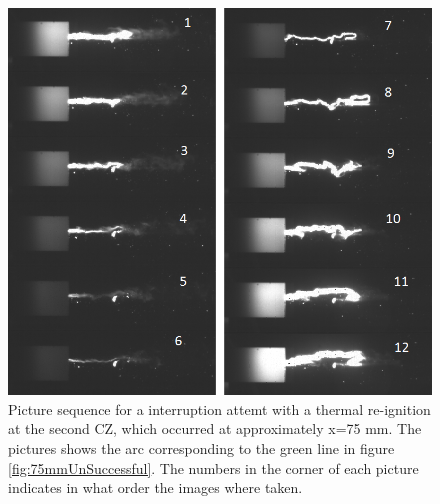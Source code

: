 \documentclass[10pt,b5paper,twoside]{article}
\begin{document}
\begin{figure}[H]
\centering
\includegraphics[scale=0.7, angle =0 ]{Bilder/Results/120_75_TR_TR.png}
\caption{Picture sequence for a interruption attemt with a thermal re-ignition at the second CZ, which occurred at approximately x=75 mm. The pictures shows the arc corresponding to the green line in figure \ref{fig:75mmUnSuccessful}. The numbers in the corner of each picture indicates in what order the images where taken.} \label{fig:arcingVoltage_test_116_green_TR}
\end{figure}
\end{document}
